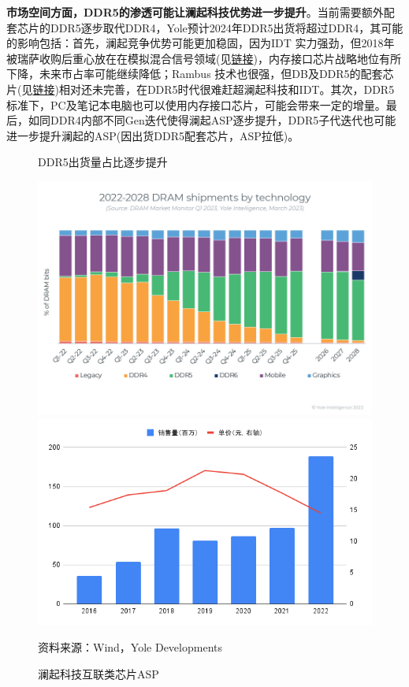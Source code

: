 \documentclass[a4paper,12pt]{ctexart}
\begin{document}
\textbf{市场空间方面，DDR5的渗透可能让澜起科技优势进一步提升}。当前需要额外配套芯片的DDR5逐步取代DDR4，Yole预计2024年DDR5出货将超过DDR4，其可能的影响包括：首先，澜起竞争优势可能更加稳固，因为IDT 实力强劲，但2018年被瑞萨收购后重心放在在模拟混合信号领域(见\href{https://www.renesas.cn/cn/zh/about/press-room/integrated-device-technology-start-operations-renesas-electronics-america-january-2020-following}{链接})，内存接口芯片战略地位有所下降，未来市占率可能继续降低；Rambus 技术也很强，但DB及DDR5的配套芯片(见\href{https://www.rambus.com/memory-and-interfaces/server-dimm-chipsets/ddr5-dimm-chipset/}{链接})相对还未完善，在DDR5时代很难赶超澜起科技和IDT。其次，DDR5标准下，PC及笔记本电脑也可以使用内存接口芯片，可能会带来一定的增量。最后，如同DDR4内部不同Gen迭代使得澜起ASP逐步提升，DDR5子代迭代也可能进一步提升澜起的ASP(因出货DDR5配套芯片，ASP拉低)。
\begin{figure}[H]
    \begin{minipage}{0.48\linewidth}
        \caption{DDR5出货量占比逐步提升}
        \centering
        \includegraphics[width=\linewidth]{img/ddr5.jpeg}
    \end{minipage}
    \begin{minipage}{0.48\linewidth}
        \caption{澜起科技互联类芯片ASP}
        \centering
        \includegraphics[width=\linewidth]{img/asp.png}
    \end{minipage}
    \par\footnotesize{资料来源：Wind，Yole Developments}
\end{figure}
\end{document}
